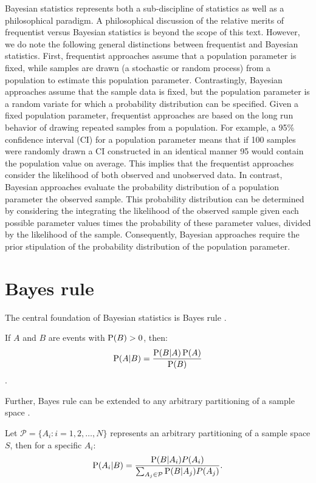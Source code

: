 \label{prelimBayesian}
\begin{DoubleSpace*}
Bayesian statistics represents both a sub-discipline of statistics as well as a philosophical paradigm. A philosophical discussion of the relative merits of frequentist versus Bayesian statistics is beyond the scope of this text. However, we do note the following general distinctions between frequentist and Bayesian statistics. First, frequentist approaches assume that a population parameter is fixed, while samples are drawn (a stochastic or random process) from a population to estimate this population parameter. Contrastingly, Bayesian approaches assume that the sample data is fixed, but the population parameter is a random variate for which a probability distribution can be specified. Given a fixed population parameter, frequentist approaches are based on the long run behavior of drawing repeated samples from a population. For example, a 95\% confidence interval (CI) for a population parameter means that if 100 samples were randomly drawn a CI constructed in an identical manner 95 would contain the population value on average. This implies that the frequentist approaches consider the likelihood of both observed and unobserved data. In contrast, Bayesian approaches evaluate the probability distribution of a population parameter the observed sample. This probability distribution can be determined by considering the integrating the likelihood of the  observed sample given each possible parameter values times the probability of these parameter values, divided by the likelihood of the sample. Consequently, Bayesian approaches require the prior stipulation of the probability distribution of the population parameter.
 
\section{Bayes rule}
The central foundation of Bayesian statistics is Bayes rule \cite{gelman2004}. 
\begin{theorem} If $A$ and $B$ are events with $\operatorname{P}(B)>0$, then:
	\begin{gather}
		\operatorname{P}(A|B) = \frac{\operatorname{P}(B|A)\operatorname{P}(A)}{\operatorname{P}(B)}
	\end{gather}.	
\end{theorem}

Further, Bayes rule can be extended to any arbitrary partitioning of a sample space \cite{casella2002}.
\begin{theorem}
	Let $\mathcal{P}=\{A_i: i=1,2, \hdots, N\}$ represents an arbitrary partitioning of a sample space $S$, then for a specific $A_i$:
	\begin{gather}
			 \operatorname{P}(A_i|B)=\frac{\operatorname{P}(B|A_i)P(A_i)}{\sum_{A_j\in \mathcal{P}}\operatorname{P}(B|A_j)P(A_j)}.
	\end{gather}
\end{theorem}


\end{DoubleSpace*}
